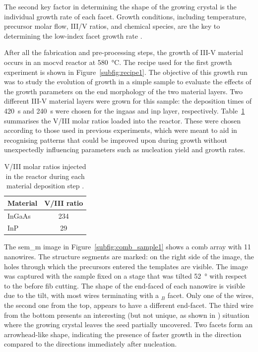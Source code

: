 The second key factor in determining the shape of the growing crystal is the individual growth rate of each facet. Growth conditions, including temperature, precursor molar flow, III/V ratios, and chemical species, are the key to determining the low-index facet growth rate \cite{Borg2015, Elsner1992}.
\par
After all the fabrication and pre-processing steps, the growth of III-V material occurs in an \acf{mocvd} reactor at \qty{580}{\degreeCelsius}. The recipe used for the first growth experiment is shown in Figure~\ref{subfig:recipe1}. The objective of this growth run was to study the evolution of growth in a simple sample to evaluate the effects of the growth parameters on the end morphology of the two material layers. Two different III-V material layers were grown for this sample: the deposition times of \qty{420}{\second} and \qty{240}{\second} were chosen for the \acs{ingaas} and \acs{inp} layer, respectively. Table~\ref{tab:sample1_ratios} summarises the V/III molar ratios loaded into the reactor. These were chosen according to those used in previous experiments, which were meant to aid in recognising patterns that could be improved upon during growth without unexpectedly influencing parameters such as nucleation yield and growth rates.

\begin{table}
    \centering
    \caption{V/III molar ratios injected in the reactor during each material deposition step \cite{Brugnolotto2023_2}.}
    \begin{tabular}{l|c}
        Material & V/III ratio \\ \hline \hline
        InGaAs  & 234\\
        InP     & 29\\ \hline
    \end{tabular}
    \label{tab:sample1_ratios}
\end{table}

The \acs{sem_m} image in Figure~\ref{subfig:comb_sample1} shows a comb array with \num{11} nanowires. The structure segments are marked: on the right side of the image, the holes through which the precursors entered the templates are visible. The image was captured with the sample fixed on a stage that was tilted \qty{52}{\degree} with respect to the  before \acs{fib} cutting. The shape of the end-faced of each nanowire is visible due to the tilt, with most wires terminating with a \(_B\) facet. Only one of the wires, the second one from the top, appears to have a different end-facet. The third wire from the bottom presents an interesting (but not unique, as shown in \cite{Scherrer2022}) situation where the growing crystal leaves the seed partially uncovered. Two  facets form an arrowhead-like shape, indicating the presence of faster growth in the  direction compared to the  directions immediately after nucleation.

